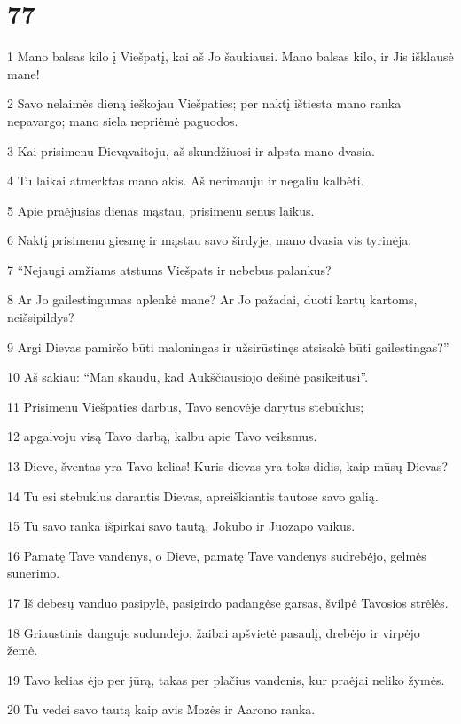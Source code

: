\chapter{77}


\par 1 Mano balsas kilo į Viešpatį, kai aš Jo šaukiausi. Mano balsas kilo, ir Jis išklausė mane! 
\par 2 Savo nelaimės dieną ieškojau Viešpaties; per naktį ištiesta mano ranka nepavargo; mano siela nepriėmė paguodos. 
\par 3 Kai prisimenu Dievą­vaitoju, aš skundžiuosi ir alpsta mano dvasia. 
\par 4 Tu laikai atmerktas mano akis. Aš nerimauju ir negaliu kalbėti. 
\par 5 Apie praėjusias dienas mąstau, prisimenu senus laikus. 
\par 6 Naktį prisimenu giesmę ir mąstau savo širdyje, mano dvasia vis tyrinėja: 
\par 7 “Nejaugi amžiams atstums Viešpats ir nebebus palankus? 
\par 8 Ar Jo gailestingumas aplenkė mane? Ar Jo pažadai, duoti kartų kartoms, neišsipildys? 
\par 9 Argi Dievas pamiršo būti maloningas ir užsirūstinęs atsisakė būti gailestingas?” 
\par 10 Aš sakiau: “Man skaudu, kad Aukščiausiojo dešinė pasikeitusi”. 
\par 11 Prisimenu Viešpaties darbus, Tavo senovėje darytus stebuklus; 
\par 12 apgalvoju visą Tavo darbą, kalbu apie Tavo veiksmus. 
\par 13 Dieve, šventas yra Tavo kelias! Kuris dievas yra toks didis, kaip mūsų Dievas? 
\par 14 Tu esi stebuklus darantis Dievas, apreiškiantis tautose savo galią. 
\par 15 Tu savo ranka išpirkai savo tautą, Jokūbo ir Juozapo vaikus. 
\par 16 Pamatę Tave vandenys, o Dieve, pamatę Tave vandenys sudrebėjo, gelmės sunerimo. 
\par 17 Iš debesų vanduo pasipylė, pasigirdo padangėse garsas, švilpė Tavosios strėlės. 
\par 18 Griaustinis danguje sudundėjo, žaibai apšvietė pasaulį, drebėjo ir virpėjo žemė. 
\par 19 Tavo kelias ėjo per jūrą, takas­ per plačius vandenis, kur praėjai­ neliko žymės. 
\par 20 Tu vedei savo tautą kaip avis Mozės ir Aarono ranka.


